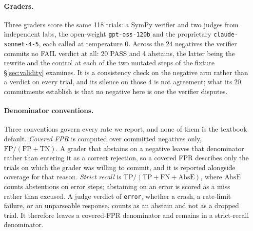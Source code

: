 \paragraph{Graders.}
Three graders score the same 118 trials: a SymPy verifier and two judges from
independent labs, the open-weight \texttt{gpt-oss-120b}
\citep{openai2025gptoss} and the proprietary \texttt{claude-sonnet-4-5}, each
called at temperature 0. Across the 24 negatives the verifier commits no FAIL
verdict at all: 20 PASS and 4 abstains, the latter being the rewrite and the
control at each of the two mutated steps of the fixture \S\ref{sec:validity}
examines. It is a consistency check on the negative arm rather than a verdict
on every trial, and its silence on those 4 is not agreement; what its 20
commitments establish is that no negative here is one the verifier disputes.

\paragraph{Denominator conventions.}
Three conventions govern every rate we report, and none of them is the
textbook default.
\emph{Covered FPR} is computed over committed negatives only,
$\mathrm{FP}/(\mathrm{FP}+\mathrm{TN})$. A grader that abstains on a negative
leaves that denominator rather than entering it as a correct rejection, so a
covered FPR describes only the trials on which the grader was willing to
commit, and it is reported alongside coverage for that reason.
\emph{Strict recall} is $\mathrm{TP}/(\mathrm{TP}+\mathrm{FN}+\mathrm{AbsE})$,
where $\mathrm{AbsE}$ counts abstentions on error steps; abstaining on an error
is scored as a miss rather than excused.
A judge verdict of \texttt{error}, whether a crash, a rate-limit failure, or an
unparseable response, counts as an abstain and not as a dropped trial. It
therefore leaves a covered-FPR denominator and remains in a strict-recall
denominator.

